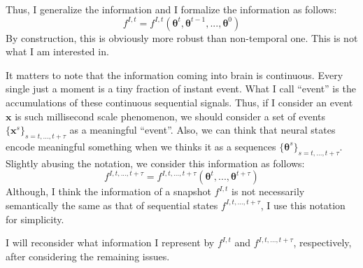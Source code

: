 \documentclass[12pt]{article}
\begin{document}
Thus, I generalize the information and I formalize the information as follows:
\begin{equation}
    f^{I, t} = f^{I, t}(\bm{\theta}^t, \bm{\theta}^{t - 1}, ..., \bm{\theta}^{0})
\end{equation}
By construction, this is obviously more robust than non-temporal one. This is not what I am interested in.

It matters to note that the information coming into brain is continuous. 
Every single just a moment is a tiny fraction of instant event. What I call 
``event'' is the accumulations of these continuous sequential signals. 
Thus, if I consider an event $\bm{x}$ is such millisecond scale phenomenon, 
we should consider a set of events $\{ \bm{x}^{s} \}_{s=t,...,t+\tau}$ as a meaningful ``event''.
Also, we can think that neural states encode meaningful something when we thinks it as 
a sequences $\{ \bm{\theta}^{s} \}_{s=t,...,t+\tau}$. Slightly abusing the notation, 
we consider this information as follows:
\begin{equation}
    f^{I, t, ..., t + \tau} = f^{I, t, ..., t + \tau}(\bm{\theta}^t, ..., \bm{\theta}^{t + \tau})
\end{equation}
Although, I think the information of a snapshot $f^{I, t}$ is not necessarily semantically the same as 
that of sequential states $f^{I, t, ..., t + \tau}$, I use this notation for simplicity. 

I will reconsider what information I represent by $f^{I, t}$ and $f^{I, t, ..., t + \tau}$, respectively, 
after considering the remaining issues.




\end{document}

